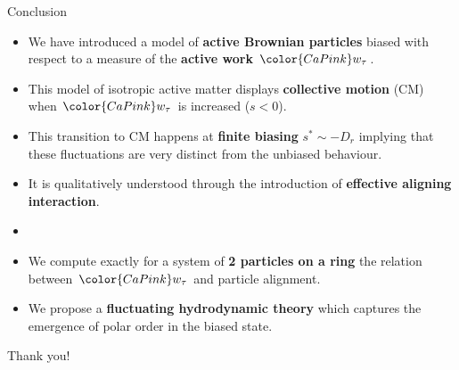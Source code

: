 \documentclass{beamer}
\begin{document}
\begin{frame}[t]{Conclusion}

\pause
\begin{itemize}[<+->]
  \item We have introduced a model of {\bf active Brownian particles} biased with respect to a measure of the {\bf active work} ${\color{CaPink} w_{\tau}}$.
  \item This model of isotropic active matter displays {\bf collective motion} (CM) when ${\color{CaPink} w_{\tau}}$ is increased ($s < 0$).
  \item This transition to CM happens at {\bf finite biasing} $s^* \sim -D_r$ implying that these fluctuations are very distinct from the unbiased behaviour.
  \item It is qualitatively understood through the introduction of {\bf effective aligning interaction}.
  \item[]
  \begin{center}
  \centering {}
  \end{center}
  \item We compute exactly for a system of {\bf 2 particles on a ring} the relation between ${\color{CaPink} w_{\tau}}$ and particle alignment.
  \item We propose a {\bf fluctuating hydrodynamic theory} which captures the emergence of polar order in the biased state.
\end{itemize}

\end{frame}


{
\footerwithoutframenumber
\begin{frame}[noframenumbering]

\begin{center}
\Huge
Thank you!
\end{center}

\end{frame}
}

\end{document}
